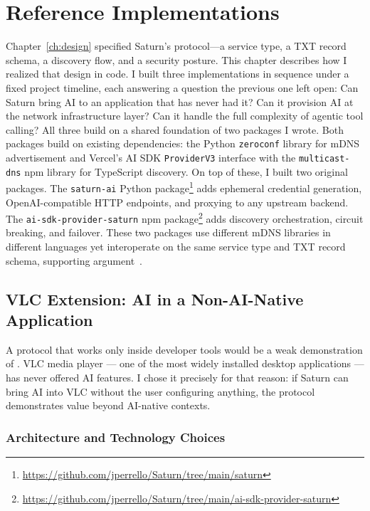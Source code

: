 \chapter{Reference Implementations}
\label{ch:implementation}

Chapter~\ref{ch:design} specified Saturn's protocol---a service type, a TXT record schema, a discovery flow, and a security posture. This chapter describes how I realized that design in code. I built three implementations in sequence under a fixed project timeline, each answering a question the previous one left open: Can Saturn bring AI to an application that has never had it? Can it provision AI at the network infrastructure layer? Can it handle the full complexity of agentic tool calling? All three build on a shared foundation of two packages I wrote. Both packages build on existing dependencies: the Python \texttt{zeroconf} library for mDNS advertisement and Vercel's AI SDK \texttt{ProviderV3} interface with the \texttt{multicast-dns} npm library for TypeScript discovery. On top of these, I built two original packages. The \texttt{saturn-ai} Python package\footnote{\url{https://github.com/jperrello/Saturn/tree/main/saturn}} adds ephemeral credential generation, OpenAI-compatible HTTP endpoints, and proxying to any upstream backend. The \texttt{ai-sdk-provider-saturn} npm package\footnote{\url{https://github.com/jperrello/Saturn/tree/main/ai-sdk-provider-saturn}} adds discovery orchestration, circuit breaking, and failover. These two packages use different mDNS libraries in different languages yet interoperate on the same service type and TXT record schema, supporting argument~.

\section{VLC Extension: AI in a Non-AI-Native Application}
\label{sec:vlc-implementation}

A protocol that works only inside developer tools would be a weak demonstration of .
VLC media player --- one of the most widely installed desktop applications --- has never offered AI features.
I chose it precisely for that reason: if Saturn can bring AI into VLC without the user configuring anything, the protocol demonstrates value beyond AI-native contexts.

\subsection{Architecture and Technology Choices}

